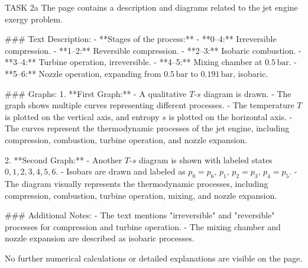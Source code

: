 TASK 2a  
The page contains a description and diagrams related to the jet engine exergy problem.  

### Text Description:  
- **Stages of the process:**  
  - **0–4:** Irreversible compression.  
  - **1–2:** Reversible compression.  
  - **2–3:** Isobaric combustion.  
  - **3–4:** Turbine operation, irreversible.  
  - **4–5:** Mixing chamber at \( 0.5 \, \text{bar} \).  
  - **5–6:** Nozzle operation, expanding from \( 0.5 \, \text{bar} \) to \( 0.191 \, \text{bar} \), isobaric.  

### Graphs:  
1. **First Graph:**  
   - A qualitative \( T \)-\( s \) diagram is drawn.  
   - The graph shows multiple curves representing different processes.  
   - The temperature \( T \) is plotted on the vertical axis, and entropy \( s \) is plotted on the horizontal axis.  
   - The curves represent the thermodynamic processes of the jet engine, including compression, combustion, turbine operation, and nozzle expansion.  

2. **Second Graph:**  
   - Another \( T \)-\( s \) diagram is shown with labeled states \( 0, 1, 2, 3, 4, 5, 6 \).  
   - Isobars are drawn and labeled as \( p_0 = p_6 \), \( p_1 \), \( p_2 = p_3 \), \( p_4 = p_5 \).  
   - The diagram visually represents the thermodynamic processes, including compression, combustion, turbine operation, mixing, and nozzle expansion.  

### Additional Notes:  
- The text mentions "irreversible" and "reversible" processes for compression and turbine operation.  
- The mixing chamber and nozzle expansion are described as isobaric processes.  

No further numerical calculations or detailed explanations are visible on the page.
